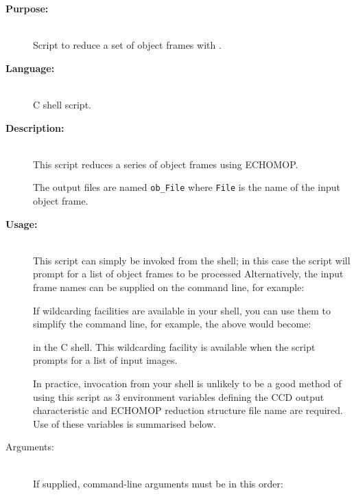 \documentclass[twoside,11pt]{starlink}
\begin{document}
\begin{description}

\item [\textbf{Purpose:}] \mbox{} \\
     Script to reduce a set of object frames with .

\item [\textbf{Language:}] \mbox{} \\
     C shell script.

\item [\textbf{Description:}] \mbox{} \\
     This script reduces a series of object frames using ECHOMOP.

     The output files are named \verb+ob_File+ where \verb+File+ is the
     name of the input object frame.

\item [\textbf{Usage:}] \mbox{} \\
     This script can simply be invoked from the shell; in this case
     the script will prompt for a list of object frames to be processed
     Alternatively, the input frame names can be supplied on the
     command line, for example:

\begin{terminalv}
\end{terminalv}

     If wildcarding facilities are available in your shell, you can use
     them to simplify the command line, for example, the above would
     become:

\begin{terminalv}
\end{terminalv}

     in the C shell.  This wildcarding facility is available when the
     script prompts for a list of input images.

     In practice, invocation from your shell is unlikely to be a good
     method of using this script as 3 environment variables defining
     the CCD output characteristic and ECHOMOP reduction structure file
     name are required.  Use of these variables is summarised below.

\item [Arguments:] \mbox{} \\
     If supplied, command-line arguments must be in this order:

\begin{enumerate}


\end{enumerate}
\end{description}
\end{document}
